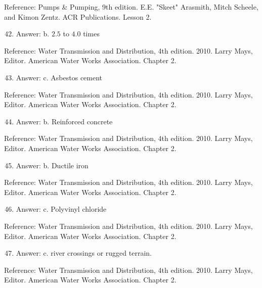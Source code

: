 \documentclass[10pt]{article}
\begin{document}
Reference: Pumps \& Pumping, 9th edition. E.E. "Skeet" Arasmith, Mitch Scheele, and Kimon Zentz. ACR Publications. Lesson 2.

\begin{enumerate}
  \setcounter{enumi}{41}
  \item Answer: b. $2.5$ to $4.0$ times
\end{enumerate}

Reference: Water Transmission and Distribution, 4th edition. 2010. Larry Mays, Editor. American Water Works Association. Chapter 2.

\begin{enumerate}
  \setcounter{enumi}{42}
  \item Answer: c. Asbestos cement
\end{enumerate}

Reference: Water Transmission and Distribution, 4th edition. 2010. Larry Mays, Editor. American Water Works Association. Chapter 2.

\begin{enumerate}
  \setcounter{enumi}{43}
  \item Answer: b. Reinforced concrete
\end{enumerate}

Reference: Water Transmission and Distribution, 4th edition. 2010. Larry Mays, Editor. American Water Works Association. Chapter 2.

\begin{enumerate}
  \setcounter{enumi}{44}
  \item Answer: b. Ductile iron
\end{enumerate}

Reference: Water Transmission and Distribution, 4th edition. 2010. Larry Mays, Editor. American Water Works Association. Chapter 2.

\begin{enumerate}
  \setcounter{enumi}{45}
  \item Answer: c. Polyvinyl chloride
\end{enumerate}

Reference: Water Transmission and Distribution, 4th edition. 2010. Larry Mays, Editor. American Water Works Association. Chapter 2.

\begin{enumerate}
  \setcounter{enumi}{46}
  \item Answer: c. river crossings or rugged terrain.
\end{enumerate}

Reference: Water Transmission and Distribution, 4th edition. 2010. Larry Mays, Editor. American Water Works Association. Chapter 2.
\end{document}
